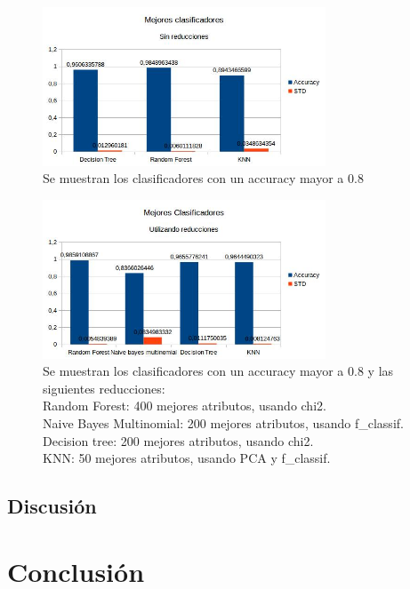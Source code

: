 \documentclass[a4paper]{article}
\begin{document}
\begin{figure}[h]
    \centering
    \includegraphics[width=0.75\textwidth]{imagenes/sinredtrain.jpg}
    \caption{Se muestran los clasificadores con un accuracy mayor a 0.8}
    \label{fig:1}
\end{figure}



\begin{figure}[h]
    \centering
    \includegraphics[width=0.75\textwidth]{imagenes/conredtrain.jpg}
    \caption{Se muestran los clasificadores con un accuracy mayor a 0.8 y las siguientes reducciones:\\
   Random Forest: 400 mejores atributos, usando chi2.\\
   Naive Bayes Multinomial: 200 mejores atributos, usando f\_classif.\\
   Decision tree: 200 mejores atributos, usando chi2.\\
   KNN: 50 mejores atributos, usando PCA y f_classif. }
    \label{fig:2}
\end{figure}

\subsection{Discusión}

\section{Conclusión}
\end{document}
